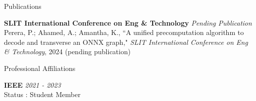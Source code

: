 \documentclass[
	11pt, %
]{./assets/resume} %
\begin{document}





\begin{rSection}{Publications}

	\textbf{SLIT International Conference on Eng \& Technology } \hfill  \textit{Pending Publication}\\
	Perera, P.; Ahamed, A.; Amantha, K., ``A unified precomputation algorithm to decode and transverse an ONNX graph," \emph{SLIT International Conference on Eng \& Technology}, 2024 (pending publication)


\end{rSection}


\begin{rSection}{Professional Affiliations}

	\textbf{IEEE} \hfill \textit{2021 - 2023} \\ 
	Status : Student Member

\end{rSection}



\end{document}
